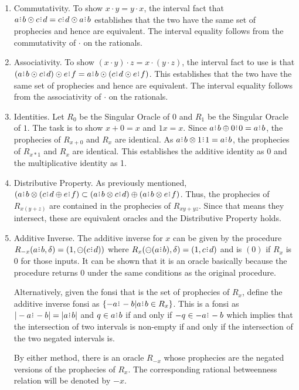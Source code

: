 \documentclass[12pt]{article}
\begin{document}
\begin{enumerate}
    \item Commutativity. To show $x\cdot y = y \cdot x$, the interval fact that $a\rint b \odot c\rint d = c\rint d \odot a\rint b$ establishes that the two have the same set of prophecies and hence are equivalent. The interval equality follows from the commutativity of $\cdot$  on the rationals. 
    \item Associativity. To show $(x\cdot y) \cdot z = x \cdot (y \cdot z)$, the interval fact to use is that $(a\rint b \odot c\rint d) \odot e\rint f = a\rint b \odot (c\rint d \odot e\rint f)$. This establishes that the two have the same set  of prophecies and hence are equivalent. The interval equality follows from the associativity of $\cdot$ on the rationals. 
    \item Identities. Let $R_0$ be the Singular Oracle of $0$ and $R_1$ be the Singular Oracle of $1$. The task is to show $x+0=x$ and $1x  = x$.  Since $a\rint b \oplus 0\rint 0 = a\rint b$, the prophecies of $R_{x+0}$ and $R_x$ are identical. As $a\rint b \otimes 1\rint 1 = a\rint b$, the prophecies of $R_{x*1}$ and $R_x$ are identical. This establishes the additive identity as 0 and the multiplicative identity as 1. 
    \item Distributive Property. As previously mentioned, $( a\rint b \otimes ( c\rint d \oplus e\rint f) \subset (a\rint b \otimes c\rint d) \oplus (a\rint b \otimes e\rint f)$. Thus, the prophecies of $R_{x(y+z)}$ are contained in the prophecies of $R_{xy + yz}$. Since that means they intersect, these are equivalent oracles and the Distributive Property holds. 
    \item Additive Inverse.  The additive inverse for $x$ can be given by the procedure $R_{-x}(a\rint b, \delta) = (1, \ominus (c\rint d))$ where $R_x (\ominus (a\rint b), \delta) = (1, c\rint d)$  and is $(0)$  if $R_x$ is $0$  for those inputs. It can be shown that it is an oracle basically because the procedure returns $0$ under the same conditions as the original procedure.

    Alternatively, given the fonsi that is the set of prophecies of $R_x$, define the additive inverse fonsi as $\{-a\rint -b| a\rint b \in R_x\}$. This is a fonsi as $|-a\rint -b| = |a\rint b|$ and  $q \in a\rint b$ if and only if $-q \in -a\rint -b$ which implies that the intersection of two intervals is non-empty if and only if the intersection of the two negated intervals is. 

    By either method, there is an oracle $R_{-x}$ whose prophecies are the negated versions of the prophecies of $R_x$. The corresponding rational betweenness relation will be denoted by $-x$.
    

\end{enumerate}
\end{document}
